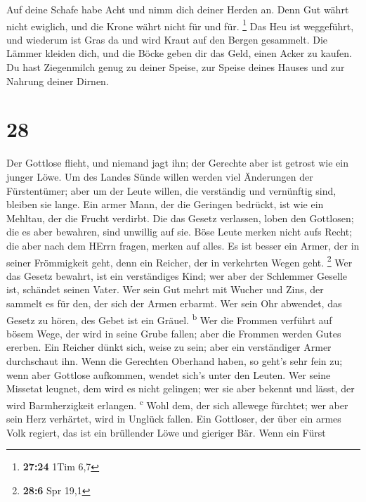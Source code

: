  Auf deine Schafe habe Acht und nimm dich deiner Herden
an.  Denn Gut währt nicht ewiglich, und die Krone währt
nicht für und für. \footnote{\textbf{27:24} 1Tim 6,7} 
Das Heu ist weggeführt, und wiederum ist Gras da und wird Kraut auf den
Bergen gesammelt.  Die Lämmer kleiden dich, und die Böcke
geben dir das Geld, einen Acker zu kaufen.  Du hast
Ziegenmilch genug zu deiner Speise, zur Speise deines Hauses und zur
Nahrung deiner Dirnen.

\hypertarget{section-27}{%
\section{28}\label{section-27}}

 Der Gottlose flieht, und niemand jagt ihn; der Gerechte
aber ist getrost wie ein junger Löwe.  Um des Landes Sünde
willen werden viel Änderungen der Fürstentümer; aber um der Leute
willen, die verständig und vernünftig sind, bleiben sie lange.
 Ein armer Mann, der die Geringen bedrückt, ist wie ein
Mehltau, der die Frucht verdirbt.  Die das Gesetz
verlassen, loben den Gottlosen; die es aber bewahren, sind unwillig auf
sie.  Böse Leute merken nicht aufs Recht; die aber nach
dem HErrn fragen, merken auf alles.  Es ist besser ein
Armer, der in seiner Frömmigkeit geht, denn ein Reicher, der in
verkehrten Wegen geht. \footnote{\textbf{28:6} Spr 19,1} 
Wer das Gesetz bewahrt, ist ein verständiges Kind; wer aber der
Schlemmer Geselle ist, schändet seinen Vater.  Wer sein
Gut mehrt mit Wucher und Zins, der sammelt es für den, der sich der
Armen erbarmt.  Wer sein Ohr abwendet, das Gesetz zu
hören, des Gebet ist ein Gräuel. \textsuperscript{b}  Wer
die Frommen verführt auf bösem Wege, der wird in seine Grube fallen;
aber die Frommen werden Gutes ererben.  Ein Reicher dünkt
sich, weise zu sein; aber ein verständiger Armer durchschaut ihn.
 Wenn die Gerechten Oberhand haben, so geht's sehr fein
zu; wenn aber Gottlose aufkommen, wendet sich's unter den Leuten.
 Wer seine Missetat leugnet, dem wird es nicht gelingen;
wer sie aber bekennt und lässt, der wird Barmherzigkeit erlangen.
\textsuperscript{c}  Wohl dem, der sich allewege
fürchtet; wer aber sein Herz verhärtet, wird in Unglück fallen.
 Ein Gottloser, der über ein armes Volk regiert, das ist
ein brüllender Löwe und gieriger Bär.  Wenn ein Fürst
